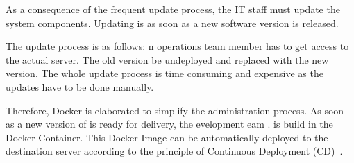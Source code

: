 As a consequence of the frequent update process, the IT staff must update the system components.
Updating is  as soon as a new software version is released.

The  update process is as follows:
n operations team member has to get access to the actual server.
The old version  be undeployed and replaced with the new version. 
The whole update process is time consuming and expensive as the updates have to be done manually.

Therefore, Docker is elaborated to simplify the administration process. 
As soon as a new  version of \CoCoME is ready for delivery, the evelopment eam .
\CoCoME is build in the Docker Container.
This Docker Image can be automatically deployed to the destination server according to the principle of Continuous Deployment (CD)~\cite{olsson2012climbing}. 















	
	
